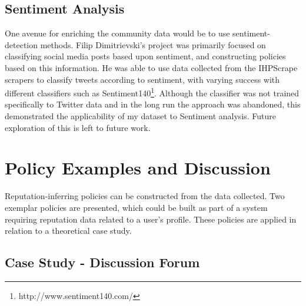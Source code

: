
\subsection{Sentiment Analysis}

One avenue for enriching the community data would be to use sentiment-detection methods. Filip Dimitrievski's project was primarily focused on classifying social media posts based upon sentiment, and constructing policies based on this information. He was able to use data collected from the IHPScrape scrapers to classify tweets according to sentiment, with varying success with different classifiers such as Sentiment140\footnote{http://www.sentiment140.com/}. Although the classifier was not trained specifically to Twitter data and in the long run the approach was abandoned, this demonstrated the applicability of my dataset to Sentiment analysis. Future exploration of this is left to future work.


\section{Policy Examples and Discussion}

Reputation-inferring policies can be constructed from the data collected. Two exemplar policies are presented, which could be built as part of a system requiring reputation data related to a user's profile. These policies are applied in relation to a theoretical case study.


\subsection{Case Study - Discussion Forum}

